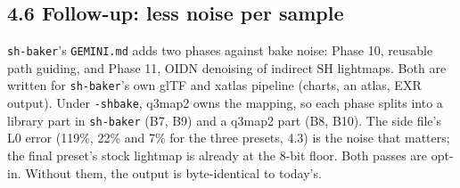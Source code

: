 \documentclass[11pt,a4paper]{article}
\begin{document}
\subsection{4.6 Follow-up: less noise per sample}
\texttt{sh-baker}'s \texttt{GEMINI.md} adds two phases against bake noise: Phase 10, reusable path
guiding, and Phase 11, OIDN denoising of indirect SH lightmaps. Both are written for
\texttt{sh-baker}'s own glTF and xatlas pipeline (charts, an atlas, EXR output). Under
\texttt{-shbake}, q3map2 owns the mapping, so each phase splits into a library part in
\texttt{sh-baker} (B7, B9) and a q3map2 part (B8, B10). The side file's L0 error (119\%, 22\% and
7\% for the three presets, 4.3) is the noise that matters; the final preset's stock lightmap is
already at the 8-bit floor. Both passes are opt-in. Without them, the output is byte-identical to
today's.
\end{document}
